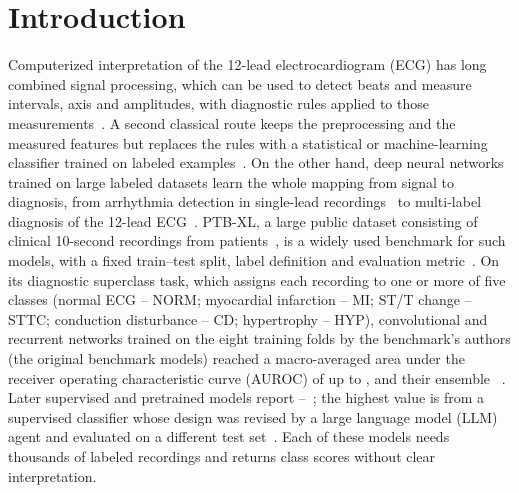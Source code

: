 \section{Introduction}

Computerized interpretation of the 12-lead electrocardiogram (ECG) has long combined signal processing, which can be used to detect
beats and measure intervals, axis and amplitudes, with diagnostic rules applied to those
measurements~\citep{schlapfer2017computer,willems1991diagnostic}. A second classical route keeps the preprocessing and
the measured features but replaces the rules with a statistical or machine-learning classifier trained on labeled
examples~\citep{dechazal2004heartbeats,lyon2018computational}. On the other hand, deep neural networks trained on large
labeled datasets learn the whole mapping from signal to diagnosis, from arrhythmia detection in single-lead
recordings~\citep{hannun2019cardiologist} to multi-label diagnosis of the 12-lead ECG~\citep{ribeiro2020automatic}. PTB-XL, a large public dataset consisting of \NRecordsTotal{} clinical 10-second recordings
from \NPatients{} patients~\citep{Wagner2020,Wagner2022physionet}, is a widely used benchmark for such models, with a
fixed train--test split, label definition and evaluation metric~\citep{Strodthoff2021}. On its diagnostic superclass task, which assigns each
recording to one or more of five classes (normal ECG -- NORM; myocardial infarction -- MI; ST/T change -- STTC; conduction
disturbance -- CD; hypertrophy -- HYP), convolutional and recurrent networks trained on the eight training folds by the
benchmark's authors (the original benchmark models) reached a
macro-averaged area under the receiver operating characteristic curve (AUROC) of up to \BestSingleBenchmarkAUROC, and
their ensemble \BestPublishedAUROC~\citep{Strodthoff2021}. Later supervised and pretrained models report
\MinLaterAUROC--\MaxReportedAUROC~\citep{shi2023multires,zhang2023spacetime,behrouz2024chimera,karami2025msssm,kim2024ecgjepa,lunelli2025benchecg,coppola2024hubertecg,almasud2026benchmarking,almasud2026pretraining,deng2026recursiveecg};
the highest value is from a supervised classifier whose design was revised by a large language model (LLM) agent and evaluated on a
different test set~\citep{deng2026recursiveecg}. Each of these models needs thousands of labeled recordings and returns class scores
without clear interpretation.

